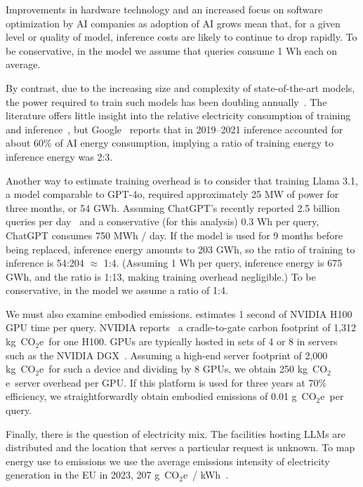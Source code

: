 \documentclass[11pt]{article}
\newcommand{\coe}{CO$_2$e}
\newcommand{\gcoe}{g~\coe}
\newcommand{\kgcoe}{k\gcoe}
\newcommand{\gcoekwh}{\gcoe\ / kWh}
\begin{document}
Improvements in hardware technology and an increased focus on software optimization by AI companies as adoption of AI grows mean that, for a given level or quality of model, inference costs are likely to continue to drop rapidly. To be conservative, in the model we assume that queries consume 1 Wh each on average.

By contrast, due to the increasing size and complexity of state-of-the-art models, the power required to train such models has been doubling annually~\cite{epoch2024powerusagetrend}. The literature offers little insight into the relative electricity consumption of training and inference~\cite{verdecchia2023systematic}, but Google~\cite{patterson:footprint:2022} reports that in 2019--2021 inference accounted for about 60\% of AI energy consumption, implying a ratio of training energy to inference energy was 2:3.

Another way to estimate training overhead is to consider that training Llama 3.1, a model comparable to GPT-4o, required approximately 25 MW of power for three months, or 54 GWh. Assuming ChatGPT's recently reported 2.5 billion queries per day~\cite{techcrunch:chatgpt} and a conservative (for this analysis) 0.3 Wh per query, ChatGPT consumes 750 MWh / day. If the model is used for 9 months before being replaced, inference energy amounts to 203 GWh, so the ratio of training to inference is 54:204 $\approx$ 1:4. (Assuming 1 Wh per query, inference energy is 675 GWh, and the ratio is 1:13, making training overhead negligible.) To be conservative, in the model we assume a ratio of 1:4.

We must also examine embodied emissions. \textcite{epoch2025howmuchenergydoeschatgptuse} estimates 1 second of NVIDIA H100 GPU time per query. NVIDIA reports~\cite{nvidia:h100} a cradle-to-gate carbon footprint of 1,312 \kgcoe\ for one H100. GPUs are typically hosted in sets of 4 or 8 in servers such as the NVIDIA DGX~\cite{nvidia:dgx}. Assuming a high-end server footprint of 2,000 \kgcoe\ for such a device and dividing by 8 GPUs, we obtain 250 \kgcoe\ server overhead per GPU. If this platform is used for three years at 70\% efficiency, we straightforwardly obtain embodied emissions of 0.01 \gcoe\ per query.


Finally, there is the question of electricity mix. The facilities hosting LLMs are distributed and the location that serves a particular request is unknown. To map energy use to emissions we use the average emissions intensity of electricity generation in the EU in 2023, 207 \gcoekwh~\cite{eea:emissions:2025}.
\end{document}
